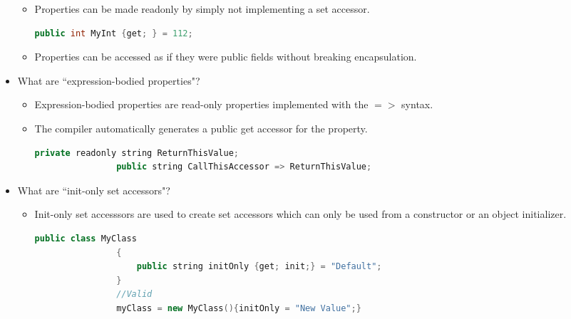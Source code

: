 \documentclass{article}
\begin{document}
\begin{itemize}
\begin{itemize}
        \item Properties can be made readonly by simply not implementing a set accessor.
        \begin{lstlisting}[language=C++]
                public int MyInt {get; } = 112; \end{lstlisting}
        \item Properties can be accessed as if they were public fields without breaking encapsulation.
    \end{itemize}
    \item What are ``expression-bodied properties"?
    \begin{itemize}
        \item Expression-bodied properties are read-only properties implemented with the $=>$ syntax.
        \item The compiler automatically generates a public get accessor for the property.
         \begin{lstlisting}[language=C++]
                private readonly string ReturnThisValue;
                public string CallThisAccessor => ReturnThisValue;\end{lstlisting}
    \end{itemize}
    \item What are ``init-only set accessors"?
    \begin{itemize}
        \item Init-only set accesssors are used to create set accessors which can only be used from a constructor or an object initializer.
        \begin{lstlisting}[language=C++]
                public class MyClass
                {
                    public string initOnly {get; init;} = "Default";
                }
                //Valid
                myClass = new MyClass(){initOnly = "New Value";}


\end{lstlisting}
\end{itemize}
\end{itemize}
\end{document}
